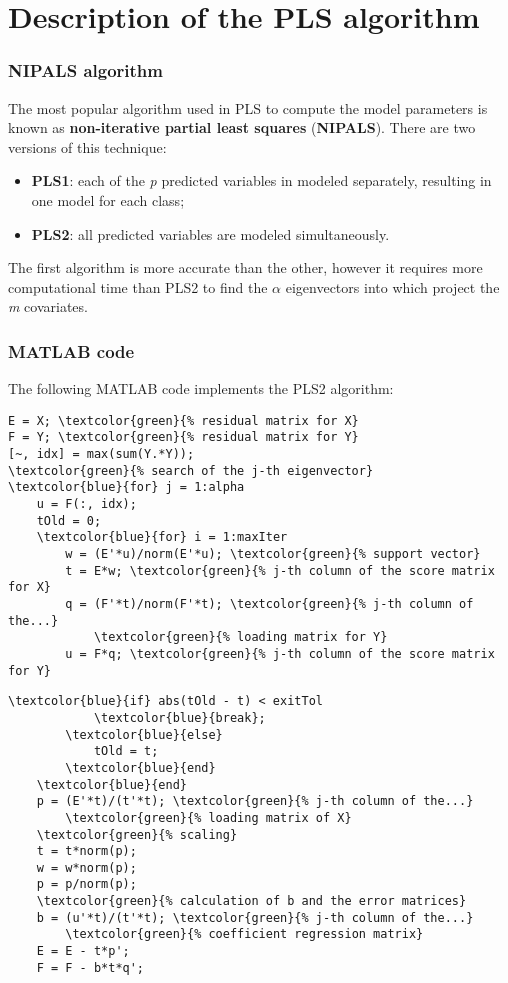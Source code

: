 \section{Description of the PLS  algorithm}

\begin{frame}[fragile]
	\frametitle{NIPALS algorithm}
	The most popular algorithm used in PLS to compute the model parameters is known as \textbf{non-iterative partial least squares} (\textbf{NIPALS}). There are two versions of this technique:
	\begin{itemize}
		\item \textbf{PLS1}: each of the \textit{p} predicted variables in modeled separately, resulting in one model for each class;
		\item \textbf{PLS2}: all predicted variables are modeled simultaneously.
	\end{itemize}
	The first algorithm is more accurate than the other, however it requires more computational time than PLS2 to find the $\alpha$ eigenvectors into which project the \textit{m} covariates. 
\end{frame}

\begin{frame}[fragile]
	\frametitle{MATLAB code}
	The following MATLAB code implements the PLS2 algorithm:
	\begin{Verbatim}[tabsize=4, commandchars=\\\{\}, frame=topline]
E = X; \textcolor{green}{% residual matrix for X}
F = Y; \textcolor{green}{% residual matrix for Y}
[~, idx] = max(sum(Y.*Y));
\textcolor{green}{% search of the j-th eigenvector}
\textcolor{blue}{for} j = 1:alpha
	u = F(:, idx);
	tOld = 0;
	\textcolor{blue}{for} i = 1:maxIter
		w = (E'*u)/norm(E'*u); \textcolor{green}{% support vector}
		t = E*w; \textcolor{green}{% j-th column of the score matrix for X}
		q = (F'*t)/norm(F'*t); \textcolor{green}{% j-th column of the...}
			\textcolor{green}{% loading matrix for Y}
		u = F*q; \textcolor{green}{% j-th column of the score matrix for Y}
	\end{Verbatim}
\end{frame}

\begin{frame}[fragile]
	\begin{Verbatim}[tabsize=4, commandchars=\\\{\}]
		\textcolor{blue}{if} abs(tOld - t) < exitTol
			\textcolor{blue}{break};
		\textcolor{blue}{else}
			tOld = t;
		\textcolor{blue}{end}
	\textcolor{blue}{end}
	p = (E'*t)/(t'*t); \textcolor{green}{% j-th column of the...}
		\textcolor{green}{% loading matrix of X}
	\textcolor{green}{% scaling}
	t = t*norm(p);
	w = w*norm(p);
	p = p/norm(p);
	\textcolor{green}{% calculation of b and the error matrices}
	b = (u'*t)/(t'*t); \textcolor{green}{% j-th column of the...}
	    \textcolor{green}{% coefficient regression matrix}
	E = E - t*p';
	F = F - b*t*q';
	\end{Verbatim}
\end{frame}

